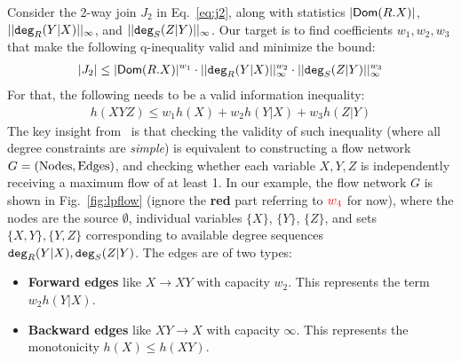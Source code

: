 \begin{example}
    \label{ex:lpflow}
    Consider the 2-way join $J_2$ in Eq.~\eqref{eq:j2}, along with statistics $|\textsf{Dom}(R.X)|$, $||\texttt{deg}_R(Y|X)||_\infty$, and
    $||\texttt{deg}_S(Z|Y)||_\infty$.  Our target is to find coefficients
    $w_1, w_2, w_3$ that make the following q-inequality valid and
    minimize the bound:
\begin{align}
    |J_2| \leq
        |\textsf{Dom}(R.X)|^{w_1} \cdot
        ||\texttt{deg}_R(Y|X)||_\infty^{w_2} \cdot
        ||\texttt{deg}_S(Z|Y)||_\infty^{w_3}
    \label{eq:lpflow:j2}
\end{align}
For that, the following needs to be a valid information inequality:
\begin{align}
    h(XYZ) \leq w_1 h(X) + w_2 h(Y|X) + w_3 h(Z|Y)
    \label{eq:lpflow:j2:ineq}
\end{align}
The key insight from~\cite{DBLP:journals/corr/abs-2211-08381} is that
checking the validity of such inequality (where all degree constraints
are {\em simple}) is equivalent to constructing a flow network
$G=(\text{Nodes},\text{Edges})$, and checking whether each variable $X, Y, Z$ is
independently receiving a maximum flow of at least 1.  In our
example, the flow network $G$ is shown in Fig.~\ref{fig:lpflow}
(ignore the \textbf{\color{red}red} part referring to ${\color{red}w_4}$ for now), where the nodes are the source $\emptyset$, individual variables $\{X\}$, $\{Y\}$, $\{Z\}$,
and sets $\{X, Y\}, \{Y, Z\}$ corresponding to available degree sequences
$\texttt{deg}_R(Y|X), \texttt{deg}_S(Z|Y)$.  The edges are of two types:
\begin{itemize}
    \item \textbf{Forward edges} like $X \to XY$ with capacity $w_2$. This represents the term $w_2 h(Y|X)$.
    \item \textbf{\color{gray}Backward edges} like $XY \to X$ with capacity $\infty$. This represents the monotonicity $h(X) \leq h(XY)$.
\end{itemize}




\end{example}
